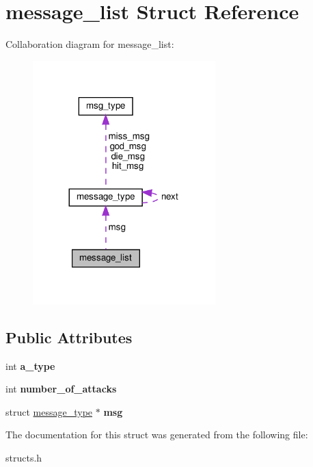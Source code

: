 \hypertarget{structmessage__list}{}\section{message\+\_\+list Struct Reference}
\label{structmessage__list}


Collaboration diagram for message\+\_\+list\+:\nopagebreak
\begin{figure}[H]
\begin{center}
\leavevmode
\includegraphics[width=200pt]{structmessage__list__coll__graph}
\end{center}
\end{figure}
\subsection*{Public Attributes}
\begin{DoxyCompactItemize}
\item 
\mbox{\label{structmessage__list_a74fceaced03e336bdf83ca08d63515ab}} 
int {\bfseries a\+\_\+type}
\item 
\mbox{\label{structmessage__list_a2484b3f342cb61930c1c7dd58b13af39}} 
int {\bfseries number\+\_\+of\+\_\+attacks}
\item 
\mbox{\label{structmessage__list_aa9f384ba025827ef0a3ec15d6b78a478}} 
struct \hyperlink{structmessage__type}{message\+\_\+type} $\ast$ {\bfseries msg}
\end{DoxyCompactItemize}


The documentation for this struct was generated from the following file\+:\begin{DoxyCompactItemize}
\item 
structs.\+h\end{DoxyCompactItemize}
